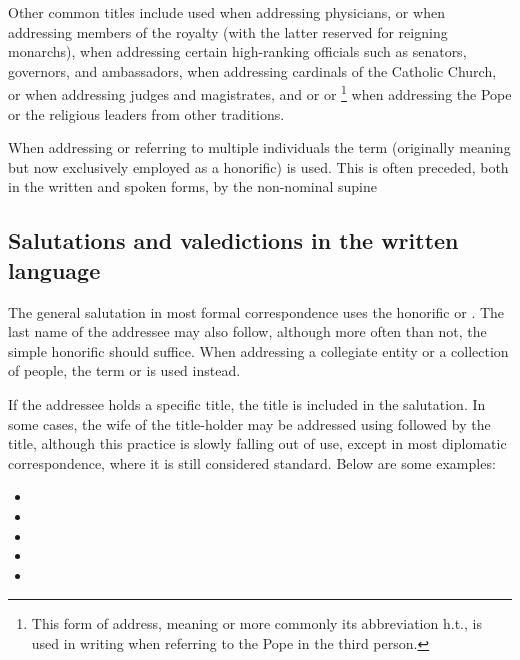 Other common titles include  used when addressing physicians,  or 
when addressing members of the royalty (with the latter reserved for reigning monarchs),  when
addressing certain high-ranking officials such as senators, governors, and ambassadors,  when addressing
cardinals of the Catholic Church,  or  when addressing judges and magistrates, and
 or  or \footnote{This form of address, meaning
 or more commonly its abbreviation {\sc h.t.}, is used in writing when referring to the Pope in the
third person.} when addressing the Pope or the religious leaders from other traditions.

When addressing or referring to multiple individuals the term  (originally meaning 
but now exclusively employed as a honorific) is used. This is often preceded, both in the written and spoken forms,
by the non-nominal supine 

\subsection{Salutations and valedictions in the written language}

The general salutation in most formal correspondence uses the honorific  or .
The last name of the addressee may also follow, although more often than not, the simple honorific 
should suffice. When addressing a collegiate entity or a collection of people, the term  or
 is used instead.

If the addressee holds a specific title, the title is included in the salutation. In some cases, the wife of the
title-holder may be addressed using  followed by the title, although this practice is slowly falling out
of use, except in most diplomatic correspondence, where it is still considered standard. Below are some examples:


\begin{itemize}[nosep]
	\item {}
	\item {}
	\item {}
	\item {}
	\item {}
\end{itemize}

